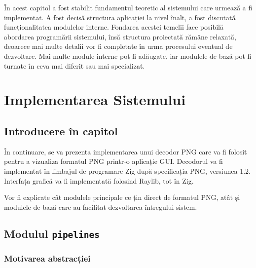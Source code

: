 \documentclass[a4paper,12pt]{report}
\begin{document}

În acest capitol a fost stabilit fundamentul teoretic al sistemului care urmează a fi implementat.
A fost decisă structura aplicației la nivel înalt, a fost discutată funcționalitatea modulelor interne.
Fondarea acestei temelii face posibilă abordarea programării sistemului,
însă structura proiectată rămâne relaxată, deoarece mai multe detalii
vor fi completate în urma procesului eventual de dezvoltare.
Mai multe module interne pot fi adăugate,
iar modulele de bază pot fi turnate în ceva mai diferit sau mai specializat.

\chapter{Implementarea Sistemului}\label{implementation_chapter_title}

\section{Introducere în capitol}

În continuare, se va prezenta implementarea unui decodor \ac{PNG} care va fi folosit pentru
a vizualiza formatul \ac{PNG} printr-o aplicație \ac{GUI}.
Decodorul va fi implementat în limbajul de programare Zig\cite{zig}
după specificația \ac{PNG}, versiunea 1.2\cite{png_spec}.
Interfața grafică va fi implementată folosind Raylib\cite{raylib}, tot în Zig.

Vor fi explicate cât modulele principale ce țin direct de formatul PNG,
atât și modulele de bază care au facilitat dezvoltarea întregului sistem.

\section{Modulul \texttt{pipelines}}

\subsection{Motivarea abstracției}
\end{document}
